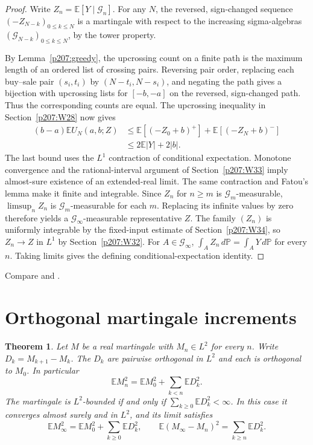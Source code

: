 \documentclass[11pt,oneside,openany]{book}
\theoremstyle{plain}
\newtheorem{theorem}{Theorem}[chapter]
\theoremstyle{definition}
\theoremstyle{remark}
\begin{document}
\begin{proof}
Write \(Z_n=\mathbb E[Y\mid\mathcal G_n]\).
For any \(N\), the reversed, sign-changed sequence
\((-Z_{N-k})_{0\le k\le N}\) is a martingale with respect to the
increasing sigma-algebras \((\mathcal G_{N-k})_{0\le k\le N}\),
by the tower property.

By Lemma~\ref{p207:greedy}, the upcrossing count on a finite path
is the maximum length of an ordered list of crossing pairs.
Reversing pair order, replacing each buy--sale pair \((s_i,t_i)\)
by \((N-t_i,N-s_i)\), and negating the path gives a bijection
with upcrossing lists for \([-b,-a]\) on the reversed, sign-changed
path. Thus the corresponding counts are equal.
The upcrossing inequality in Section~\ref{p207:W28} now gives
\[
 \begin{split}
 (b-a)\mathbb E U_N(a,b;Z)
 &\le \mathbb E[(-Z_0+b)^+]+\mathbb E[(-Z_N+b)^-]\\
 &\le 2\mathbb E|Y|+2|b|.
 \end{split}
\]
The last bound uses the \(L^1\) contraction of conditional
expectation. Monotone convergence and the rational-interval argument
of Section~\ref{p207:W33} imply almost-sure existence of an
extended-real limit. The same contraction and Fatou's lemma
make it finite and integrable. Since \(Z_n\) for \(n\ge m\) is
\(\mathcal G_m\)-measurable, \(\limsup_n Z_n\) is
\(\mathcal G_m\)-measurable for each \(m\). Replacing its
infinite values by zero therefore yields a
\(\mathcal G_\infty\)-measurable representative \(Z\).
The family \((Z_n)\) is uniformly integrable by the fixed-input
estimate of Section~\ref{p207:W34}, so \(Z_n\to Z\) in \(L^1\) by
Section~\ref{p207:W32}. For \(A\in\mathcal G_\infty\),
\(\int_A Z_n\,d\mathbb P=\int_A Y\,d\mathbb P\) for every \(n\).
Taking limits gives the defining conditional-expectation identity.
\end{proof}

\noindent
Compare \cite[Section 14.4]{Williams} and \cite[Section 4.7]{Durrett}.

\section{Orthogonal martingale increments}
\label{p207:W38}

\begin{theorem}
Let \(M\) be a real martingale with \(M_n\in L^2\) for every \(n\).
Write \(D_k=M_{k+1}-M_k\). The \(D_k\) are pairwise orthogonal
in \(L^2\) and each is orthogonal to \(M_0\). In particular
\[
 \mathbb E M_n^2=\mathbb E M_0^2+\sum_{k<n}\mathbb ED_k^2 .
\]
The martingale is \(L^2\)-bounded if and only if
\(\sum_{k\ge0}\mathbb ED_k^2<\infty\). In this case it converges
almost surely and in \(L^2\), and its limit satisfies
\[
 \mathbb E M_\infty^2=\mathbb E M_0^2+\sum_{k\ge0}\mathbb ED_k^2,
 \qquad
 \mathbb E(M_\infty-M_n)^2=\sum_{k\ge n}\mathbb ED_k^2 .
\]
\end{theorem}
\end{document}
